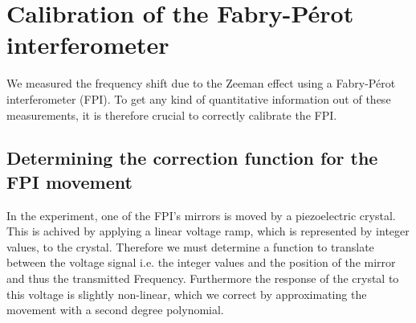 \section{Calibration of the Fabry-Pérot interferometer}
We measured the frequency shift due to the Zeeman effect using a  Fabry-Pérot interferometer (FPI). To get any kind of quantitative information out of these measurements, it is therefore crucial to correctly calibrate the FPI. 
\subsection{Determining the correction function for the FPI movement}

In the experiment, one of the FPI's mirrors is moved by a piezoelectric crystal. This is achived by applying a linear voltage ramp, which is represented by integer values,  to the crystal. Therefore we must determine a function to translate between the voltage signal i.e. the integer values and the position of the mirror and thus the transmitted Frequency. Furthermore the response of the crystal to this voltage is slightly non-linear, which we correct by approximating the movement with a second degree polynomial. 

